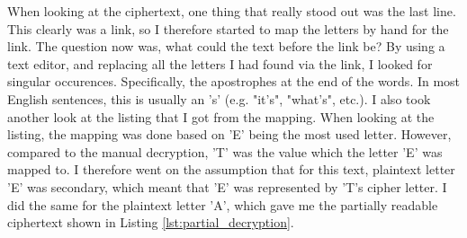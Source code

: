 When looking at the ciphertext, one thing that really stood out was the last line. 
This clearly was a link, so I therefore started to map the letters by hand for the link. 
The question now was, what could the text before the link be? 
By using a text editor, and replacing all the letters I had found via the link, I looked for singular occurences. 
Specifically, the apostrophes at the end of the words. 
In most English sentences, this is usually an 's' (e.g. "it's", "what's", etc.). 
\vspace{0.5em}\newline
I also took another look at the listing that I got from the mapping. 
When looking at the listing, the mapping was done based on 'E' being the most used letter. 
However, compared to the manual decryption, 'T' was the value which the letter 'E' was mapped to. 
I therefore went on the assumption that for this text, plaintext letter 'E' was secondary, which meant that 'E' was represented by 'T's cipher letter.
I did the same for the plaintext letter 'A', which gave me the partially readable ciphertext shown in Listing \ref{lst:partial_decryption}.

